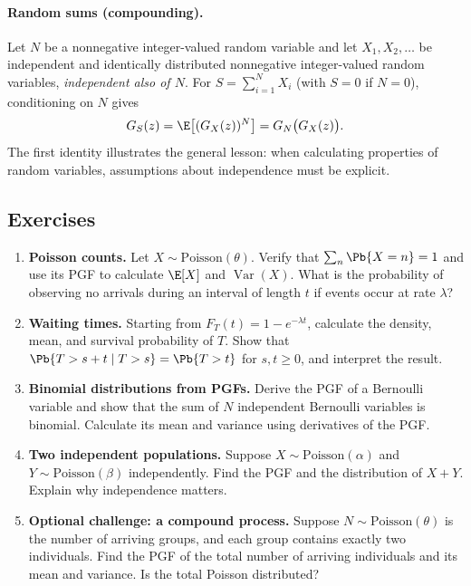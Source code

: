 \paragraph{Random sums (compounding).}
Let $N$ be a nonnegative integer-valued random variable and let $X_1,X_2,\ldots$ be independent and identically distributed nonnegative integer-valued random variables, \emph{independent also of $N$}. For $S=\sum_{i=1}^{N}X_i$ (with $S=0$ if $N=0$), conditioning on $N$ gives
\begin{equation}
 G_S(z)=\E\big[(G_X(z))^N\big]=G_N\big(G_X(z)\big).
 \label{eq:basic_compound}
\end{equation}
The first identity illustrates the general lesson: when calculating properties of random variables, assumptions about independence must be explicit.

\subsection{Exercises}
\label{sec:basic_exercises}
\begin{enumerate}[label=\textbf{Exercise \arabic*.},leftmargin=*]
 \item \textbf{Poisson counts.} Let $X\sim\mathrm{Poisson}(\theta)$. Verify that $\sum_n\Pb\{X=n\}=1$ and use its PGF to calculate $\E[X]$ and $\operatorname{Var}(X)$. What is the probability of observing no arrivals during an interval of length $t$ if events occur at rate $\lambda$?
 \item \textbf{Waiting times.} Starting from $F_T(t)=1-e^{-\lambda t}$, calculate the density, mean, and survival probability of $T$. Show that $\Pb\{T>s+t\mid T>s\}=\Pb\{T>t\}$ for $s,t\geq0$, and interpret the result.
 \item \textbf{Binomial distributions from PGFs.} Derive the PGF of a Bernoulli variable and show that the sum of $N$ independent Bernoulli variables is binomial. Calculate its mean and variance using derivatives of the PGF.
 \item \textbf{Two independent populations.} Suppose $X\sim\mathrm{Poisson}(\alpha)$ and $Y\sim\mathrm{Poisson}(\beta)$ independently. Find the PGF and the distribution of $X+Y$. Explain why independence matters.
 \item \textbf{Optional challenge: a compound process.} Suppose $N\sim\mathrm{Poisson}(\theta)$ is the number of arriving groups, and each group contains exactly two individuals. Find the PGF of the total number of arriving individuals and its mean and variance. Is the total Poisson distributed?
\end{enumerate}

